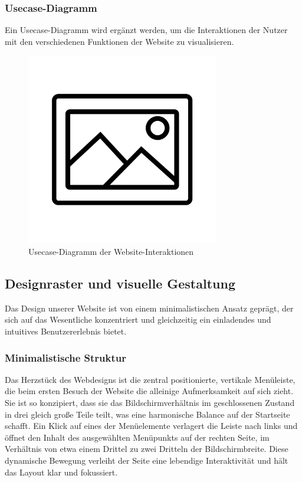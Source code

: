 \subsubsection{Usecase-Diagramm}
Ein Usecase-Diagramm wird ergänzt werden, um die Interaktionen der Nutzer mit den verschiedenen Funktionen der Website zu visualisieren. 

\begin{figure}[h]
\centering
\includegraphics[width=0.75\textwidth]{Resources/usecase.png}
\caption{Usecase-Diagramm der Website-Interaktionen}
\end{figure}

\newpage

\subsection{Designraster und visuelle Gestaltung}

Das Design unserer Website ist von einem minimalistischen Ansatz geprägt, der sich auf das Wesentliche konzentriert und gleichzeitig ein einladendes und intuitives Benutzererlebnis bietet.

\subsubsection{Minimalistische Struktur}
Das Herzstück des Webdesigns ist die zentral positionierte, vertikale Menüleiste, die beim ersten Besuch der Website die alleinige Aufmerksamkeit auf sich zieht. Sie ist so konzipiert, dass sie das Bildschirmverhältnis im geschlossenen Zustand in drei gleich große Teile teilt, was eine harmonische Balance auf der Startseite schafft. Ein Klick auf eines der Menüelemente verlagert die Leiste nach links und öffnet den Inhalt des ausgewählten Menüpunkts auf der rechten Seite, im Verhältnis von etwa einem Drittel zu zwei Dritteln der Bildschirmbreite. Diese dynamische Bewegung verleiht der Seite eine lebendige Interaktivität und hält das Layout klar und fokussiert.

